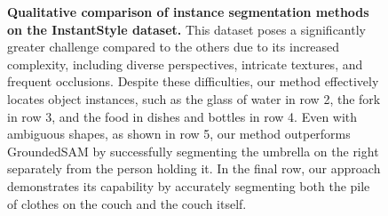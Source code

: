 \begin{figure}
{{\begin{tabular}{c @{\hskip 10pt} c c c c}
    \end{tabular}
    }
    \vspace{-0.1cm}
    \caption{\textbf{Qualitative comparison of instance segmentation methods on the InstantStyle dataset.} This dataset poses a significantly greater challenge compared to the others due to its increased complexity, including diverse perspectives, intricate textures, and frequent occlusions. Despite these difficulties, our method effectively locates object instances, such as the glass of water in row 2, the fork in row 3, and the food in dishes and bottles in row 4. Even with ambiguous shapes, as shown in row 5, our method outperforms GroundedSAM by successfully segmenting the umbrella on the right separately from the person holding it. In the final row, our approach demonstrates its capability by accurately segmenting both the pile of clothes on the couch and the couch itself.}
    \label{fig:comparison_instance_instantstyle}
    }
\end{figure}
\newpage

